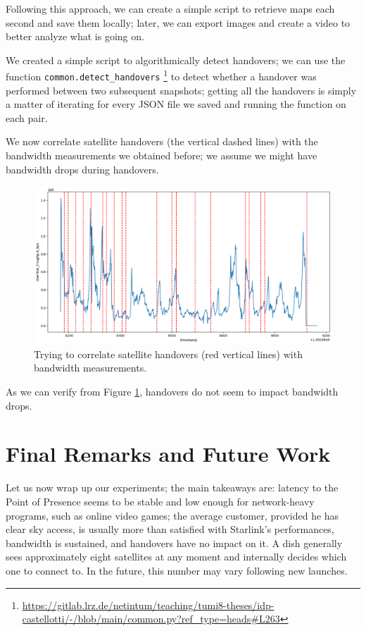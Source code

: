 \documentclass[IN,11pt,twoside,openright,idp,english]{tumthesis}
\begin{document}
Following this approach, we can create a simple script to retrieve maps each second and save them locally; later, we can export images and create a video to better analyze what is going on. 

We created a simple script to algorithmically detect handovers; we can use the function \texttt{common.detect\_handovers} \footnote{\url{https://gitlab.lrz.de/netintum/teaching/tumi8-theses/idp-castellotti/-/blob/main/common.py?ref_type=heads\#L263}} to detect whether a handover was performed between two subsequent snapshots; getting all the handovers is simply a matter of iterating for every JSON file we saved and running the function on each pair.

We now correlate satellite handovers (the vertical dashed lines) with the bandwidth measurements we obtained before; we assume we might have bandwidth drops during handovers. 

\begin{figure}
    \centering
    \includegraphics[width=1\columnwidth]{img/correlation_handovers_bw.png}
    \caption{Trying to correlate satellite handovers (red vertical lines) with bandwidth measurements.}
    \label{fig:vis-correlation-handovers}
\end{figure}

As we can verify from Figure \ref{fig:vis-correlation-handovers}, handovers do not seem to impact bandwidth drops.


\chapter{Final Remarks and Future Work}

Let us now wrap up our experiments; the main takeaways are: latency to the Point of Presence seems to be stable and low enough for network-heavy programs, such as online video games; the average customer, provided he has clear sky access, is usually more than satisfied with Starlink's performances, bandwidth is sustained, and handovers have no impact on it. A dish generally sees approximately eight satellites at any moment and internally decides which one to connect to. In the future, this number may vary following new launches.
\end{document}
